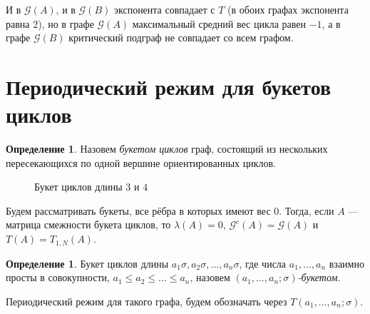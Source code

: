\documentclass[12pt]{article}
\theoremstyle{definition}
\newtheorem{definition}[theorem]{Определение}
\begin{document}
И в $\mathcal{G}(A)$, и в $\mathcal{G}(B)$ экспонента совпадает с $T$ (в обоих графах экспонента равна $2$), но в графе $\mathcal{G}(A)$ максимальный средний вес цикла равен $-1$, а в графе $\mathcal{G}(B)$ критический подграф не совпадает со всем графом.

\section{Периодический режим для букетов циклов}
\label{wedge}
\begin{definition} Назовем \textit{букетом циклов} граф, состоящий из нескольких пересекающихся по одной вершине ориентированных циклов.
\end{definition}

\begin{figure}[H]
\centering
{}
\caption{Букет циклов длины $3$ и $4$}
\end{figure}

Будем рассматривать букеты, все рёбра в которых имеют вес $0$. Тогда, если $A$ --- матрица смежности букета циклов, то $\lambda(A) = 0$, $\mathcal{G}^c(A) = \mathcal{G}(A)$ и $T(A) = T_{1, N}(A)$.

\begin{definition}
Букет циклов длины $a_1\sigma, a_2\sigma, \dots, a_n\sigma$, где числа $a_1, \dots, a_n$ взаимно просты в совокупности, $a_1\le a_2 \le \dots \le a_n$, назовем \textit{$(a_1, \dots, a_n; \sigma)$-букетом}.

Периодический режим для такого графа, будем обозначать через $T(a_1, \dots, a_n; \sigma)$.
\end{definition}
\end{document}
